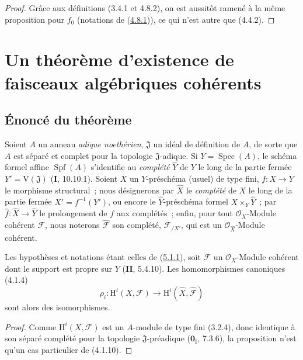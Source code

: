 \begin{proof}
Grâce aux définitions (3.4.1 et 4.8.2), on est aussitôt ramené à la même proposition
pour $f_0$ (notations de (\hyperref[III.4.8.1-fr]{4.8.1})), ce qui n'est autre que
(4.4.2).
\end{proof}

\section{Un théorème d'existence de faisceaux algébriques cohérents}
\label{section:III.5-fr}

\subsection{Énoncé du théorème}
\label{subsection:III.5.1-fr}

\begin{env}[5.1.1]
\label{III.5.1.1-fr}
Soient $A$ un anneau \emph{adique noethérien}, $\mathfrak J$ un idéal de définition de
$A$, de sorte que $A$ est séparé et complet pour la topologie $\mathfrak J$-adique.
Si $Y=\operatorname{Spec}(A)$, le schéma formel affine $\operatorname{Spf}(A)$
s'identifie au \emph{complété} $\widehat Y$ de $Y$ le long de la partie fermée
$Y'=\mathrm V(\mathfrak J)$ (\textbf{I}, 10.10.1). Soient $X$ un $Y$-préschéma (usuel) de
type fini, $f:X\to Y$ le morphisme structural~; nous désignerons par $\widehat X$
le \emph{complété} de $X$ le long de la partie fermée $X'=f^{-1}(Y')$, ou encore le
$\widehat Y$-préschéma formel $X\times_Y\widehat Y$~; par
$\widehat f:\widehat X\to\widehat Y$ le prolongement de $f$ aux complétés~; enfin,
pour tout $\mathcal O_X$-Module cohérent $\mathcal F$, nous noterons
$\widehat{\mathcal F}$ son complété, $\mathcal F_{/X'}$, qui est un
$\mathcal O_{\widehat X}$-Module cohérent.
\end{env}

\begin{proposition}[5.1.2]
\label{III.5.1.2-fr}
Les hypothèses et notations étant celles de
\textup{(\hyperref[III.5.1.1-fr]{5.1.1})}, soit $\mathcal F$ un $\mathcal O_X$-Module
cohérent dont le support est propre sur $Y$ \textup{(\textbf{II}, 5.4.10)}. Les homomorphismes
canoniques \textup{(4.1.4)}
\[
\rho_i:\mathrm H^i(X,\mathcal F)\longrightarrow
\mathrm H^i(\widehat X,\widehat{\mathcal F})
\]
sont alors des isomorphismes.
\end{proposition}

\begin{proof}
Comme $\mathrm H^i(X,\mathcal F)$ est un $A$-module de type fini (3.2.4), donc
identique à son séparé complété pour la topologie $\mathfrak J$-préadique
($\mathbf{0}_{\mathrm I}$, 7.3.6), la proposition n'est qu'un cas particulier de (4.1.10).
\end{proof}

